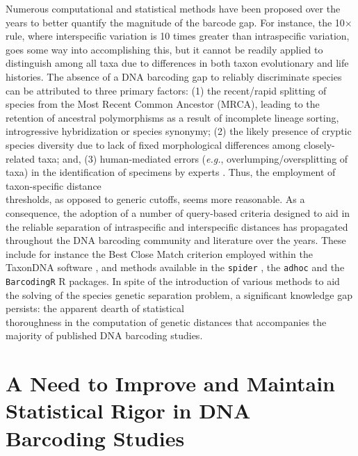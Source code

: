 Numerous computational and statistical methods have been proposed over the years to better quantify the magnitude of the barcode gap. For instance, the 10$\times$ rule, where interspecific variation is 10 times greater than intraspecific variation, goes some way into accomplishing this, but it cannot be readily applied to distinguish among all taxa due to differences in both taxon evolutionary and life histories. The absence of a DNA barcoding gap to reliably discriminate species can be attributed to three primary factors: (1) the recent/rapid splitting of species from the Most Recent Common Ancestor (MRCA), leading to the retention of ancestral polymorphisms as a result of incomplete lineage sorting, \\ introgressive hybridization or species synonymy; (2) the likely presence of cryptic species diversity due to lack of fixed morphological differences among closely-related taxa; and, (3) human-mediated errors (\textit{e.g.}, overlumping/oversplitting of taxa) in the identification of specimens by experts \cite{hubert2015dna, koroiva2018estimating}. Thus, the employment of taxon-specific distance \\ thresholds, as opposed to generic cutoffs, seems more reasonable. As a consequence, the adoption of a number of query-based criteria designed to aid in the reliable separation of intraspecific and interspecific distances has propagated throughout the DNA barcoding community and literature over the years. These include for instance the Best Close Match criterion employed within the TaxonDNA software \cite{meier2006dna}, and methods available in the {\tt spider} \cite{brown2012spider}, the {\tt adhoc} \cite{sonet2013adhoc} and the {\tt BarcodingR} \cite{zhang2016barcoding} R packages. In spite of the introduction of various methods to aid the solving of the species genetic separation problem, a significant knowledge gap persists: the apparent dearth of statistical \\ thoroughness in the computation of genetic distances that accompanies the majority of published DNA barcoding studies. 



\section{A Need to Improve and Maintain Statistical Rigor in DNA Barcoding Studies}

